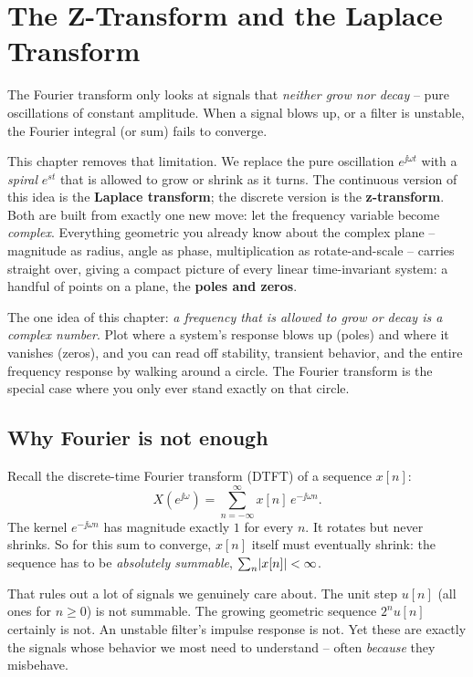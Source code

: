 \chapter{The Z-Transform and the Laplace Transform}

The Fourier transform only looks at signals that \emph{neither grow nor
decay} -- pure oscillations of constant amplitude. When a signal blows up, or a
filter is unstable, the Fourier integral (or sum) fails to converge.

This chapter removes that limitation. We replace the pure oscillation $e^{\jj\omega t}$ with a
\emph{spiral} $e^{st}$ that is allowed to grow or shrink as it turns. The continuous
version of this idea is the \textbf{Laplace transform}; the discrete version is the
\textbf{z-transform}. Both are built from exactly one new move: let the frequency
variable become \emph{complex}. Everything geometric you already know about the complex
plane -- magnitude as radius, angle as phase, multiplication as rotate-and-scale -- carries
straight over, giving a compact picture of every linear
time-invariant system: a handful of points on a plane, the \textbf{poles and zeros}.

\begin{focusbox}
The one idea of this chapter: \emph{a frequency that is allowed to grow or decay is
a complex number}. Plot where a system's response blows up (poles) and where it vanishes
(zeros), and you can read off stability, transient behavior, and the entire frequency
response by walking around a circle. The Fourier transform is the special case where you
only ever stand exactly on that circle.
\end{focusbox}

\section{Why Fourier is not enough}
\label{ch15:why-fourier-not-enough}

Recall the discrete-time Fourier transform (DTFT) of a sequence $x[n]$:
\[
  X(e^{\jj\omega}) = \sum_{n=-\infty}^{\infty} x[n]\, e^{-\jj\omega n}.
\]
The kernel $e^{-\jj\omega n}$ has magnitude exactly $1$ for every $n$. It rotates but
never shrinks. So for this sum to converge, $x[n]$ itself must eventually shrink: the
sequence has to be \emph{absolutely summable}, $\sum_n \lvert x[n]\rvert < \infty$.

That rules out a lot of signals we genuinely care about. The unit step $u[n]$ (all ones
for $n \ge 0$) is not summable. The growing geometric sequence $2^n u[n]$ certainly is
not. An unstable filter's impulse response is not. Yet these are exactly the signals
whose behavior we most need to understand -- often \emph{because} they misbehave.

